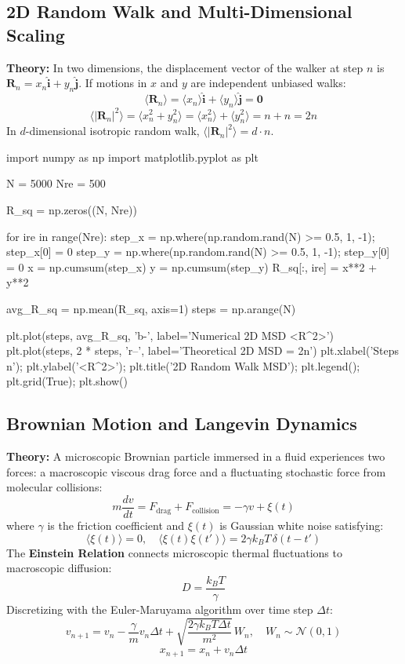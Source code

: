 \documentclass{article}
\begin{document}
\subsection{2D Random Walk and Multi-Dimensional Scaling}
\textbf{Theory:} In two dimensions, the displacement vector of the walker at step $n$ is $\mathbf{R}_n = x_n \hat{\mathbf{i}} + y_n \hat{\mathbf{j}}$. If motions in $x$ and $y$ are independent unbiased walks:
$$\langle \mathbf{R}_n \rangle = \langle x_n \rangle \hat{\mathbf{i}} + \langle y_n \rangle \hat{\mathbf{j}} = \mathbf{0}$$
$$\langle |\mathbf{R}_n|^2 \rangle = \langle x_n^2 + y_n^2 \rangle = \langle x_n^2 \rangle + \langle y_n^2 \rangle = n + n = 2n$$
In $d$-dimensional isotropic random walk, $\langle |\mathbf{R}_n|^2 \rangle = d \cdot n$.

\begin{jupytercode}
import numpy as np
import matplotlib.pyplot as plt

N = 5000
Nre = 500

R_sq = np.zeros((N, Nre))

for ire in range(Nre):
    step_x = np.where(np.random.rand(N) >= 0.5, 1, -1); step_x[0] = 0
    step_y = np.where(np.random.rand(N) >= 0.5, 1, -1); step_y[0] = 0
    x = np.cumsum(step_x)
    y = np.cumsum(step_y)
    R_sq[:, ire] = x**2 + y**2

avg_R_sq = np.mean(R_sq, axis=1)
steps = np.arange(N)

plt.plot(steps, avg_R_sq, 'b-', label='Numerical 2D MSD <R^2>')
plt.plot(steps, 2 * steps, 'r--', label='Theoretical 2D MSD = 2n')
plt.xlabel('Steps n'); plt.ylabel('<R^2>'); plt.title('2D Random Walk MSD'); plt.legend(); plt.grid(True); plt.show()
\end{jupytercode}

\subsection{Brownian Motion and Langevin Dynamics}
\textbf{Theory:} A microscopic Brownian particle immersed in a fluid experiences two forces: a macroscopic viscous drag force and a fluctuating stochastic force from molecular collisions:
$$m \frac{dv}{dt} = F_{\text{drag}} + F_{\text{collision}} = -\gamma v + \xi(t)$$
where $\gamma$ is the friction coefficient and $\xi(t)$ is Gaussian white noise satisfying:
$$\langle \xi(t) \rangle = 0, \quad \langle \xi(t) \xi(t') \rangle = 2 \gamma k_B T \, \delta(t - t')$$
The \textbf{Einstein Relation} connects microscopic thermal fluctuations to macroscopic diffusion:
$$D = \frac{k_B T}{\gamma}$$
Discretizing with the Euler-Maruyama algorithm over time step $\Delta t$:
$$v_{n+1} = v_n - \frac{\gamma}{m} v_n \Delta t + \sqrt{\frac{2 \gamma k_B T \Delta t}{m^2}} \, W_n, \quad W_n \sim \mathcal{N}(0, 1)$$
$$x_{n+1} = x_n + v_n \Delta t$$
\end{document}
